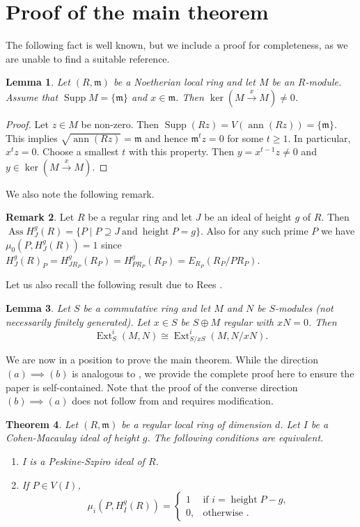\documentclass[12pt,reqno]{amsart}
\newtheorem{theorem}{Theorem}[section]
\newtheorem{lemma}[theorem]{Lemma}
\theoremstyle{definition}
\newtheorem{remark}[theorem]{Remark}
\newcommand{\m}{\mathfrak{m}}
\newcommand{\ann}{\operatorname{ann}}
\newcommand{\Ass}{\operatorname{Ass}}
\newcommand{\height}{\operatorname{height}}
\newcommand{\Supp}{\operatorname{Supp}}
\newcommand{\Ext}{\operatorname{Ext}}
\begin{document}
\section{Proof of the main theorem}
The following fact is well known, but we include a proof for completeness, as we are unable to find a suitable reference.
\begin{lemma}\label{easy lemma}
    Let $(R,\m)$ be a Noetherian local ring and let $M$ be an $R$-module. Assume that $\Supp M=\{\m\}$ and $x\in \m$. Then $\ker(M\xrightarrow{x}M)\neq 0$.
\end{lemma}
\begin{proof}
    Let $z\in M$ be non-zero. Then $\Supp(Rz)=V(\ann(Rz))=\{\m\}$. This implies $\sqrt{\ann(Rz)}=\m$ and hence $\m^tz=0$ for some $t\geq 1$. In particular, $x^tz= 0$. Choose a smallest $t$ with this property. Then $y=x^{t-1}z\neq 0$ and $y\in \ker(M\xrightarrow{x}M)$. 
\end{proof}
We also note the following remark.
\begin{remark}\label{remark about ass prime}
   Let $R$ be a regular ring and let $J$ be an ideal of height $g$ of $R$. Then $\Ass H^g_J(R)=\{P\mid P\supseteq J\ \text{and}\  \height P=g\}$. Also for any such prime $P$ we have $\mu_0(P,H^g_J(R))=1$ since $H^g_J(R)_P=H^g_{JR_P}(R_P)=H^g_{PR_P}(R_P)=E_{R_P}(R_P/PR_P)$.
\end{remark}
Let us also recall the following result due to Rees \cite[Lemma 3.1.16]{BH93}.
\begin{lemma}\label{rees lemma}
    Let $S$ be a commutative ring and let $M$ and $N$ be $S$-modules (not necessarily finitely generated). Let $x\in S$ be $S\oplus M$ regular with $xN=0$. Then $$\Ext^i_S(M,N)\cong \Ext^i_{S/xS}(M,N/xN).$$
\end{lemma}
We are now in a position to prove the main theorem. While the direction $(a) \implies (b)$ is analogous to \cite[Theorem 1.2]{Put24}, we provide the complete proof here to ensure the paper is self-contained. Note that the proof of the converse direction $(b) \implies (a)$ does not follow from \cite[Theorem 1.2]{Put24} and requires modification.
\begin{theorem} \label{proof of main theorem}
    Let $(R,\m)$ be a regular local ring of dimension $d$. Let $I$ be a Cohen-Macaulay ideal of height $g$. The following conditions are equivalent.
    \begin{enumerate}[label=(\alph*), font=\upshape]
        \item I is a Peskine-Szpiro ideal of $R$.
        \item If $P\in V(I)$,
         $$
\mu_i\left(P,H^g_I(R)\right) =
\begin{cases}
1 & \text{if } i=\height P-g,\\
0, & \text{otherwise }.
\end{cases}
$$
    \end{enumerate}
\end{theorem}
\end{document}
